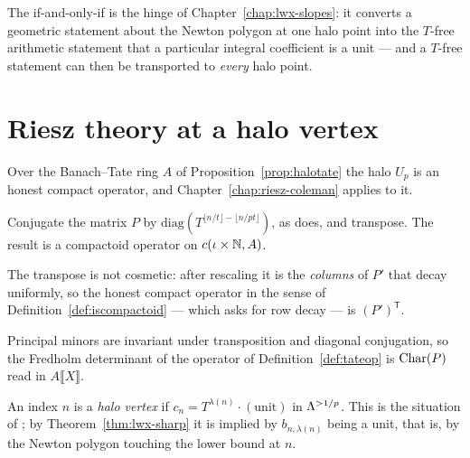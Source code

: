 The if-and-only-if is the hinge of Chapter~\ref{chap:lwx-slopes}: it converts a geometric
statement about the Newton polygon at one halo point into the $T$-free arithmetic statement that
a particular integral coefficient is a unit --- and a $T$-free statement can then be transported
to \emph{every} halo point.

\section{Riesz theory at a halo vertex}
\label{sec:tate-riesz}

Over the Banach--Tate ring $A$ of Proposition~\ref{prop:halotate} the halo $U_p$ is an honest
compact operator, and Chapter~\ref{chap:riesz-coleman} applies to it.

\begin{definition}
  \label{def:tateop}
  \leanok
  Conjugate the matrix $P$ by $\mathrm{diag}(T^{\lfloor n/t\rfloor - \lfloor n/pt\rfloor})$, as
  \cite[proof of Theorem 3.16]{LWX} does, and transpose.  The result is a compactoid operator on
  $c(\iota\times\mathbb{N}, A)$.
\end{definition}

The transpose is not cosmetic: after rescaling it is the \emph{columns} of $P'$ that decay
uniformly, so the honest compact operator in the sense of Definition~\ref{def:iscompactoid} ---
which asks for row decay --- is $(P')^{\mathsf{T}}$.

\begin{proposition}
  \label{prop:tateop-det}
  \leanok
  Principal minors are invariant under transposition and diagonal conjugation, so the Fredholm
  determinant of the operator of Definition~\ref{def:tateop} is $\operatorname{Char}(P)$ read in
  $A\llbracket X\rrbracket$.
\end{proposition}

\begin{definition}
  \label{def:halovertex}
  \leanok
  An index $n$ is a \emph{halo vertex} if $c_n = T^{\lambda(n)}\cdot(\text{unit})$ in $\Lambda^{>1/p}$.
  This is the situation of \cite[Remark 3.25]{LWX}; by Theorem~\ref{thm:lwx-sharp} it is implied
  by $b_{n,\lambda(n)}$ being a unit, that is, by the Newton polygon touching the lower bound at
  $n$.
\end{definition}

